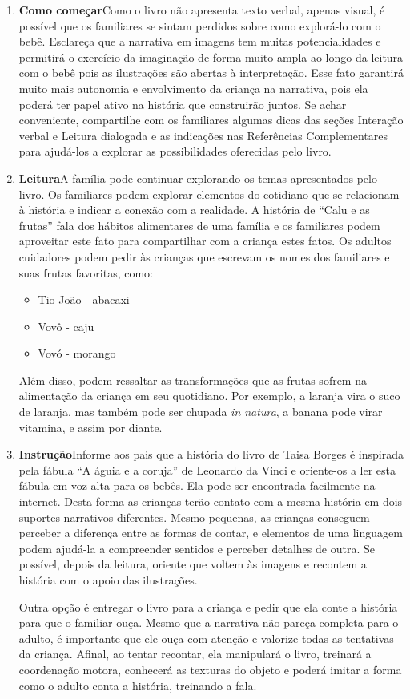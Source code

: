\documentclass[11pt]{extarticle}
\begin{document}
\begin{enumerate}
\item \textbf{Como começar}\quad Como o livro não apresenta 
texto verbal, apenas visual, é possível que os familiares se sintam 
perdidos sobre como explorá-lo com o bebê. Esclareça que a narrativa 
em imagens tem muitas potencialidades e permitirá o exercício da imaginação 
de forma muito ampla ao longo da leitura com o bebê pois as ilustrações são 
abertas à interpretação. Esse fato garantirá muito mais autonomia e 
envolvimento da criança na narrativa, pois ela poderá ter papel ativo na 
história que construirão juntos. Se achar conveniente, compartilhe com 
os familiares algumas dicas das seções Interação verbal 
e Leitura dialogada e as indicações nas Referências Complementares 
para ajudá-los a explorar as possibilidades oferecidas pelo livro. 

\item \textbf{Leitura}\quad A família pode continuar 
explorando os temas apresentados pelo livro. Os familiares podem explorar 
elementos do cotidiano que se relacionam à história e indicar a conexão 
com a realidade. A história de “Calu e as frutas” fala dos hábitos
alimentares de uma família e os familiares podem aproveitar este fato 
para compartilhar com a criança estes fatos. Os adultos cuidadores
podem pedir às crianças que escrevam os nomes dos familiares e suas frutas
favoritas, como: 
\begin{itemize}
	\item Tio João - abacaxi
	\item Vovô - caju
	\item Vovó - morango
\end{itemize}
Além disso, podem ressaltar as transformações que as frutas sofrem 
na alimentação da criança em seu quotidiano. Por exemplo, 
a laranja vira o suco de laranja, mas também pode ser chupada 
\emph{in natura}, a banana pode virar vitamina, e assim por diante. 

\item \textbf{Instrução}\quad Informe aos pais que a 
história do livro de Taisa Borges é inspirada pela fábula “A águia e a coruja” 
de Leonardo da Vinci e oriente-os a ler esta fábula em voz alta para os 
bebês. Ela pode ser encontrada facilmente na internet. Desta forma as 
crianças terão contato com a mesma história em dois suportes narrativos 
diferentes. Mesmo pequenas, as crianças conseguem perceber a diferença entre 
as formas de contar, e elementos de uma linguagem podem ajudá-la a compreender 
sentidos e perceber detalhes de outra. Se possível, depois da leitura, oriente 
que voltem às imagens e recontem a história com o apoio das 
ilustrações. 

Outra opção é entregar o livro para a criança e pedir que ela conte 
a história para que o familiar ouça. Mesmo que a narrativa não pareça 
completa para o adulto, é importante que ele ouça com atenção e 
valorize todas as tentativas da criança. Afinal, ao tentar recontar, 
ela manipulará o livro, treinará a coordenação motora, conhecerá as texturas 
do objeto e poderá imitar a forma como o adulto 
conta a história, treinando a fala. 
\end{enumerate}
\end{document}
